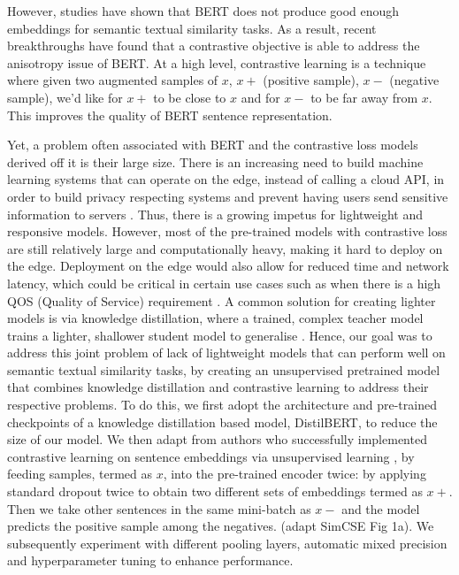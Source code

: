 \documentclass[10pt,twocolumn,letterpaper]{article}
\begin{document}
However, studies \cite{2104.08821} \cite{2105.11741} have shown that BERT does not produce good enough embeddings for semantic textual similarity tasks. As a result, recent breakthroughs \cite{2104.08821} \cite{1907.11692} have found that a contrastive objective is able to address the anisotropy issue of BERT. At a high level, contrastive learning is a technique where given two augmented samples of \(x\), \(x+\) (positive sample), \(x-\) (negative sample), we'd like for \(x+\) to be close to \(x\) and for \(x-\) to be far away from \(x\). This improves the quality of BERT sentence representation. 

Yet, a problem often associated with BERT and the contrastive loss models derived off it is their large size. There is an increasing need to build machine learning systems that can operate on the edge, instead of calling a cloud API, in order to build privacy respecting systems and prevent having users send sensitive information to servers \cite{10.3390/s22020450}. Thus, there is a growing impetus for lightweight and responsive models. However, most of the pre-trained models \cite{2104.08821} \cite{2105.11741} with contrastive loss are still relatively large and computationally heavy, making it hard to deploy on the edge. Deployment on the edge would also allow for reduced time and network latency, which could be critical in certain use cases such as when there is a high QOS (Quality of Service) requirement \cite{10.3390/s22020450}. A common solution for creating lighter models is via knowledge distillation, where a trained, complex teacher model trains  a lighter, shallower student model to generalise \cite{1910.01108}.
Hence, our goal was to address this joint problem of lack of lightweight models that can perform well on semantic textual similarity tasks, by creating an unsupervised pretrained model that combines knowledge distillation and contrastive learning to address their respective problems.  To do this, we first adopt the architecture and pre-trained checkpoints of a knowledge distillation based model, DistilBERT, to reduce the size of our model. We then adapt from authors who successfully implemented contrastive learning on sentence embeddings via unsupervised learning \cite{2104.08821}, by feeding samples, termed as \(x\), into the pre-trained encoder twice: by applying standard dropout twice to obtain two different sets of embeddings termed as \(x+\). Then we take other sentences in the same mini-batch as \(x-\) and the model predicts the positive sample among the negatives. (adapt SimCSE Fig 1a). We subsequently experiment with different pooling layers, automatic mixed precision and hyperparameter tuning to enhance performance.
\end{document}
